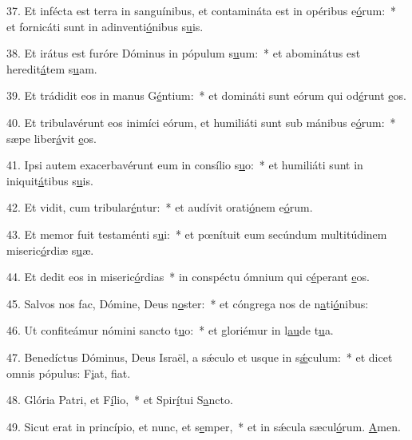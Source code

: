37. Et infécta est terra in sanguínibus, et contamináta est in opéribus e\uline{ó}rum:~* et fornicáti sunt in adinventi\uline{ó}nibus s\uline{u}is.\par 
38. Et irátus est furóre Dóminus in pópulum s\uline{u}um:~* et abominátus est heredit\uline{á}tem s\uline{u}am.\par 
39. Et trádidit eos in manus G\uline{é}ntium:~* et domináti sunt eórum qui od\uline{é}runt \uline{e}os.\par 
40. Et tribulavérunt eos inimíci eórum, et humiliáti sunt sub mánibus e\uline{ó}rum:~* sæpe liber\uline{á}vit \uline{e}os.\par 
41. Ipsi autem exacerbavérunt eum in consílio s\uline{u}o:~* et humiliáti sunt in iniquit\uline{á}tibus s\uline{u}is.\par 
42. Et vidit, cum tribular\uline{é}ntur:~* et audívit orati\uline{ó}nem e\uline{ó}rum.\par 
43. Et memor fuit testaménti s\uline{u}i:~* et pœnítuit eum secúndum multitúdinem miseric\uline{ó}rdiæ s\uline{u}æ.\par 
44. Et dedit eos in miseric\uline{ó}rdias~* in conspéctu ómnium qui c\uline{é}perant \uline{e}os.\par 
45. Salvos nos fac, Dómine, Deus n\uline{o}ster:~* et cóngrega nos de n\uline{a}ti\uline{ó}nibus:\par 
46. Ut confiteámur nómini sancto t\uline{u}o:~* et gloriémur in l\uline{au}de t\uline{u}a.\par 
47. Benedíctus Dóminus, Deus Israël, a sǽculo et usque in s\uline{ǽ}culum:~* et dicet omnis pópulus: F\uline{i}at, f\uline{i}at.\par 
48. Glória Patri, et F\uline{í}lio,~* et Spir\uline{í}tui S\uline{a}ncto.\par 
49. Sicut erat in princípio, et nunc, et s\uline{e}mper,~* et in sǽcula sæcul\uline{ó}rum. \uline{A}men.\par 
